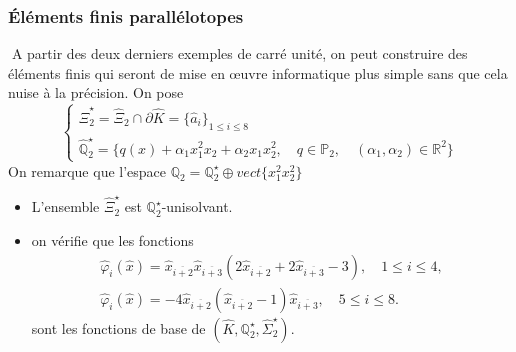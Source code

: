 \documentclass{beamer}
\begin{document}
\begin{frame}
\frametitle{Éléments finis parallélotopes}
A partir des deux derniers exemples de carré unité, 
on peut construire des éléments finis qui seront de mise en œuvre informatique 
plus simple sans que cela nuise à la précision. On pose
\begin{equation}
\left\{
\begin{array}{l}
\widehat{\Xi}_2^\star=\widehat{\Xi}_2\cap \partial \widehat{K}=\{\hat{a}_i\}_{1\leq i\leq 8}\\
\widehat{\mathbb{Q}}_2^\star=\{q(x)+\alpha_1x_1^2x_2+\alpha_2x_1x_2^2,\quad q\in\mathbb{P}_2,\quad (\alpha_1, \alpha_2)\in \mathbb{R}^2\}
\end{array} \right.
\end{equation}
On remarque que l'espace $\mathbb{Q}_2 = \mathbb{Q}_2^\star \oplus vect\{x_1^2x_2^2\}$%
\begin{itemize}
\item L'ensemble $\widehat{\Xi}_2^\star$ est $\mathbb{Q}_2^\star$-unisolvant.
\item on vérifie que les fonctions 
\begin{equation}
  \begin{array}{l}
  \hat{\varphi}_i(\hat{x})=\hat{x}_{\overline{i+2}} \hat{x}_{\overline{i+3}}  (2\hat{x}_{\overline{i+2}}+2\hat{x}_{\overline{i+3}}-3),\quad 1\leq i\leq 4,\\
  \hat{\varphi}_i(\hat{x})=-4\hat{x}_{\overline{i+2}}(\hat{x}_{\overline{i+2}}-1)\hat{x}_{\overline{i+3}},\quad 5\leq i\leq 8.
\end{array}              
\end{equation}
sont les fonctions de base de $(\widehat{K},\mathbb{Q}_2^\star,\widehat{\Sigma}_2^\star)$.
\end{itemize}
\end{frame}

\end{document}
